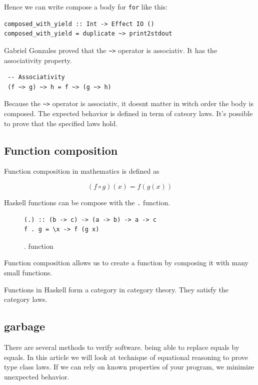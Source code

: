 Hence we can write compose a body for \verb|for| like this:
\begin{verbatim}
composed_with_yield :: Int -> Effect IO ()
composed_with_yield = duplicate ~> print2stdout
\end{verbatim}

Gabriel Gonzales proved that the \verb|~>| operator is associativ. It has the associativity property.

\begin{verbatim}
 -- Associativity
 (f ~> g) ~> h = f ~> (g ~> h)
\end{verbatim}

Because the \verb|~>| operator is associativ, it doesnt matter in witch order the body is composed. The expected behavior is defined in term of cateory laws. It's possible to prove that the specified laws hold.


\subsection{Function composition}

\label{sec:functioncomposition}

Function composition in mathematics is defined as

\begin{equation}
  \label{eq:functioncomposition}
  (f \circ g)(x) = f(g(x))
\end{equation}

Haskell functions can be compose with the \verb|.| function.

\begin{figure}
  \centering
\begin{verbatim}
(.) :: (b -> c) -> (a -> b) -> a -> c
f . g = \x -> f (g x)
\end{verbatim}
  \caption{. function}
  \label{fig:compositionfunction}
\end{figure}

Function composition allows us to create a function by composing it with many small functions. 

Functions in Haskell form a category in category theory. They satisfy the category laws.


\subsection{garbage}
 There are several methods to verify software.
being able to replace equals by equals.
In this article we will look at technique of equational reasoning to prove type class laws. If we can rely on known properties of your program, we minimize unexpected behavior.


